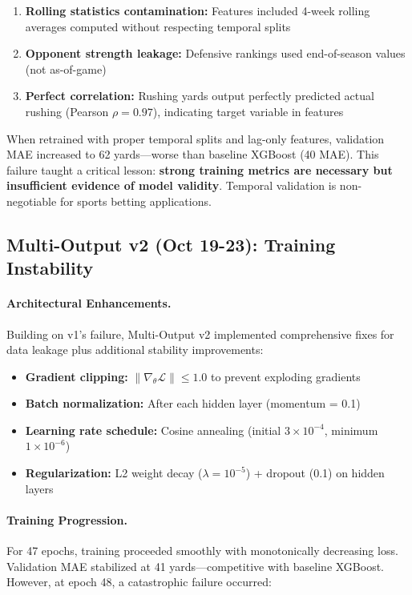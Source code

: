 \begin{enumerate}[itemsep=2pt,parsep=0pt]
    \item \textbf{Rolling statistics contamination:} Features included 4-week rolling averages computed without respecting temporal splits
    \item \textbf{Opponent strength leakage:} Defensive rankings used end-of-season values (not as-of-game)
    \item \textbf{Perfect correlation:} Rushing yards output perfectly predicted actual rushing (Pearson $\rho = 0.97$), indicating target variable in features
\end{enumerate}

When retrained with proper temporal splits and lag-only features, validation MAE increased to 62 yards---worse than baseline XGBoost (40 MAE). This failure taught a critical lesson: \textbf{strong training metrics are necessary but insufficient evidence of model validity}. Temporal validation is non-negotiable for sports betting applications.

\subsection{Multi-Output v2 (Oct 19-23): Training Instability}

\paragraph{Architectural Enhancements.}
Building on v1's failure, Multi-Output v2 implemented comprehensive fixes for data leakage plus additional stability improvements:

\begin{itemize}[itemsep=2pt,parsep=0pt]
    \item \textbf{Gradient clipping:} $\|\nabla_{\theta} \mathcal{L}\| \leq 1.0$ to prevent exploding gradients
    \item \textbf{Batch normalization:} After each hidden layer (momentum = 0.1)
    \item \textbf{Learning rate schedule:} Cosine annealing (initial $3 \times 10^{-4}$, minimum $1 \times 10^{-6}$)
    \item \textbf{Regularization:} L2 weight decay ($\lambda = 10^{-5}$) + dropout (0.1) on hidden layers
\end{itemize}

\paragraph{Training Progression.}
For 47 epochs, training proceeded smoothly with monotonically decreasing loss. Validation MAE stabilized at 41 yards---competitive with baseline XGBoost. However, at epoch 48, a catastrophic failure occurred:

